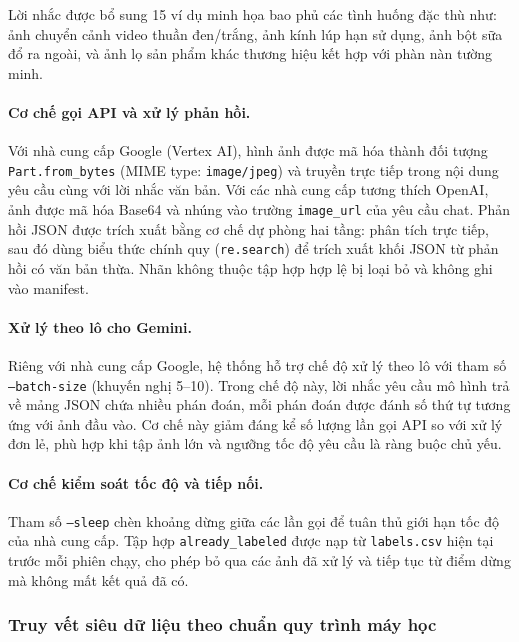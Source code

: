 Lời nhắc được bổ sung 15 ví dụ minh họa bao phủ các tình
huống đặc thù như: ảnh chuyển cảnh video thuần đen/trắng, ảnh kính lúp hạn sử dụng,
ảnh bột sữa đổ ra ngoài, và ảnh lọ sản phẩm khác thương hiệu kết hợp với phàn nàn
tường minh.

\paragraph{Cơ chế gọi API và xử lý phản hồi.}
Với nhà cung cấp Google (Vertex AI), hình ảnh được mã hóa thành đối tượng
\texttt{Part.from\_bytes} (MIME type: \texttt{image/jpeg}) và truyền trực tiếp trong
nội dung yêu cầu cùng với lời nhắc văn bản. Với các nhà cung cấp tương thích OpenAI,
ảnh được mã hóa Base64 và nhúng vào trường \texttt{image\_url} của yêu cầu chat.
Phản hồi JSON được trích xuất bằng cơ chế dự phòng hai tầng: phân tích trực tiếp,
sau đó dùng biểu thức chính quy (\texttt{re.search}) để trích xuất khối JSON từ
phản hồi có văn bản thừa. Nhãn không thuộc tập hợp hợp lệ bị loại bỏ và không ghi
vào manifest.

\paragraph{Xử lý theo lô cho Gemini.}
Riêng với nhà cung cấp Google, hệ thống hỗ trợ chế độ xử lý theo lô
với tham số \texttt{--batch-size} (khuyến nghị 5--10). Trong
chế độ này, lời nhắc yêu cầu mô hình trả về mảng JSON chứa nhiều phán đoán, mỗi
phán đoán được đánh số thứ tự tương ứng với ảnh đầu vào. Cơ chế này giảm đáng kể
số lượng lần gọi API so với xử lý đơn lẻ, phù hợp khi tập ảnh lớn và ngưỡng tốc độ
yêu cầu là ràng buộc chủ yếu.

\paragraph{Cơ chế kiểm soát tốc độ và tiếp nối.}
Tham số \texttt{--sleep} chèn khoảng dừng giữa các lần gọi để tuân thủ giới hạn tốc
độ của nhà cung cấp. Tập hợp \texttt{already\_labeled} được nạp từ \texttt{labels.csv}
hiện tại trước mỗi phiên chạy, cho phép bỏ qua các ảnh đã xử lý và tiếp tục từ điểm
dừng mà không mất kết quả đã có.



\subsubsection{Truy vết siêu dữ liệu theo chuẩn quy trình máy học}

